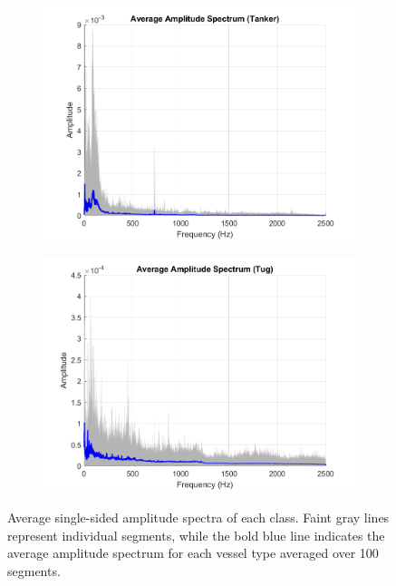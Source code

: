 \begin{figure}[p]
    \begin{subfigure}{0.49\textwidth}
        \centering
        \includegraphics[width=\linewidth]{img/ch3/freq_ampl/tanker_freq_amplitude.png} 
    \end{subfigure}
    \hfill
    \begin{subfigure}{0.49\textwidth}
        \centering
        \includegraphics[width=\linewidth]{img/ch3/freq_ampl/tug_freq_amplitude.png} 
    \end{subfigure}

    \caption{Average single-sided amplitude spectra of each class. Faint gray lines represent individual segments, while the bold blue line indicates the average amplitude spectrum for each vessel type averaged over 100 segments.}
    \label{fig:freq-ampl-highf}
\end{figure}

